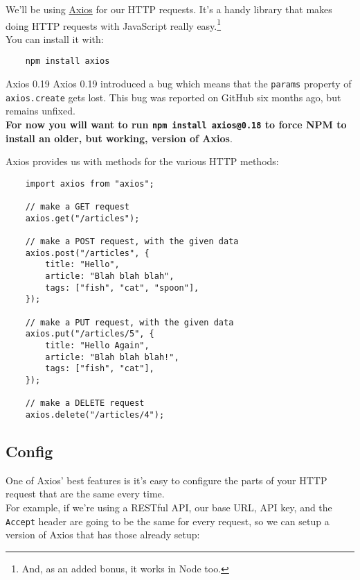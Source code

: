 We'll be using \href{https://github.com/mzabriskie/axios}{Axios} for our HTTP requests. It's a handy library that makes doing HTTP requests with JavaScript really easy.\footnote{And, as an added bonus, it works in Node too.}
\\

You can install it with:

\begin{verbatim}
    npm install axios
\end{verbatim}


\begin{infobox}{Axios 0.19}
    Axios 0.19 introduced a bug which means that the \texttt{params} property of \\ \texttt{axios.create} gets lost. This bug was reported on GitHub six months ago, but remains unfixed.
    \\

    \textbf{For now you will want to run \texttt{npm install axios@0.18} to force NPM to install an older, but working, version of Axios}.
\end{infobox}


Axios provides us with methods for the various HTTP methods:

\begin{verbatim}
    import axios from "axios";

    // make a GET request
    axios.get("/articles");

    // make a POST request, with the given data
    axios.post("/articles", {
        title: "Hello",
        article: "Blah blah blah",
        tags: ["fish", "cat", "spoon"],
    });

    // make a PUT request, with the given data
    axios.put("/articles/5", {
        title: "Hello Again",
        article: "Blah blah blah!",
        tags: ["fish", "cat"],
    });

    // make a DELETE request
    axios.delete("/articles/4");
\end{verbatim}


\subsection{Config}

One of Axios' best features is it's easy to configure the parts of your HTTP request that are the same every time.
\\

For example, if we're using a RESTful API, our base URL, API key, and the \texttt{Accept} header are going to be the same for every request, so we can setup a version of Axios that has those already setup:

